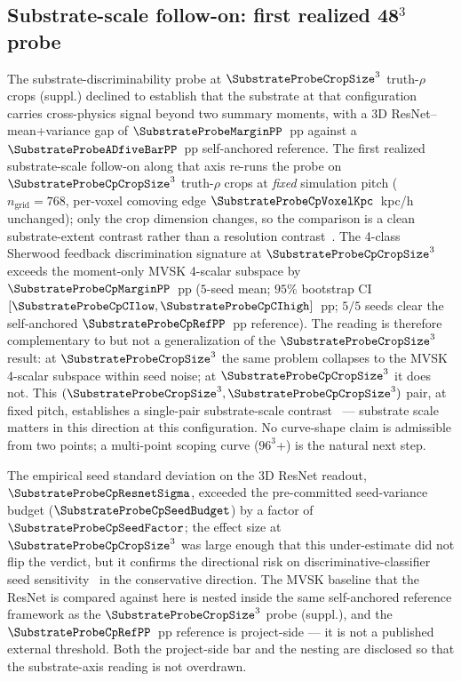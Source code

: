 \subsection{Substrate-scale follow-on: first realized 48$^3$ probe}
\label{sec:nextsteps:substrate-cprime}
The substrate-discriminability probe at $\SubstrateProbeCropSize^3$ truth-$\rho$ crops (suppl.) declined to establish that the substrate at that configuration carries cross-physics signal beyond two summary moments, with a 3D ResNet--mean+variance gap of $\SubstrateProbeMarginPP$~pp against a $\SubstrateProbeADfiveBarPP$~pp self-anchored reference. The first realized substrate-scale follow-on along that axis re-runs the probe on $\SubstrateProbeCpCropSize^3$ truth-$\rho$ crops at \emph{fixed} simulation pitch ($n_{\text{grid}}=768$, per-voxel comoving edge $\SubstrateProbeCpVoxelKpc$~kpc/h unchanged); only the crop dimension changes, so the comparison is a clean substrate-extent contrast rather than a resolution contrast~\cite{touvron2019fixres}. The 4-class Sherwood feedback discrimination signature at $\SubstrateProbeCpCropSize^3$ exceeds the moment-only MVSK 4-scalar subspace by $\SubstrateProbeCpMarginPP$~pp ($5$-seed mean; $95\%$ bootstrap CI $[\SubstrateProbeCpCIlow, \SubstrateProbeCpCIhigh]$~pp; $5/5$ seeds clear the self-anchored $\SubstrateProbeCpRefPP$~pp reference). The reading is therefore complementary to but not a generalization of the $\SubstrateProbeCropSize^3$ result: at $\SubstrateProbeCropSize^3$ the same problem collapses to the MVSK 4-scalar subspace within seed noise; at $\SubstrateProbeCpCropSize^3$ it does not. This $(\SubstrateProbeCropSize^3, \SubstrateProbeCpCropSize^3)$ pair, at fixed pitch, establishes a single-pair substrate-scale contrast~\cite{alain_bengio2017probing} --- substrate scale matters in this direction at this configuration. No curve-shape claim is admissible from two points; a multi-point scoping curve ($96^3$+) is the natural next step.

The empirical seed standard deviation on the 3D ResNet readout, $\SubstrateProbeCpResnetSigma$, exceeded the pre-committed seed-variance budget ($\SubstrateProbeCpSeedBudget$) by a factor of $\SubstrateProbeCpSeedFactor$; the effect size at $\SubstrateProbeCpCropSize^3$ was large enough that this under-estimate did not flip the verdict, but it confirms the directional risk on discriminative-classifier seed sensitivity~\cite{damour2020underspecification} in the conservative direction. The MVSK baseline that the ResNet is compared against here is nested inside the same self-anchored reference framework as the $\SubstrateProbeCropSize^3$ probe (suppl.), and the $\SubstrateProbeCpRefPP$~pp reference is project-side --- it is not a published external threshold. Both the project-side bar and the nesting are disclosed so that the substrate-axis reading is not overdrawn.

